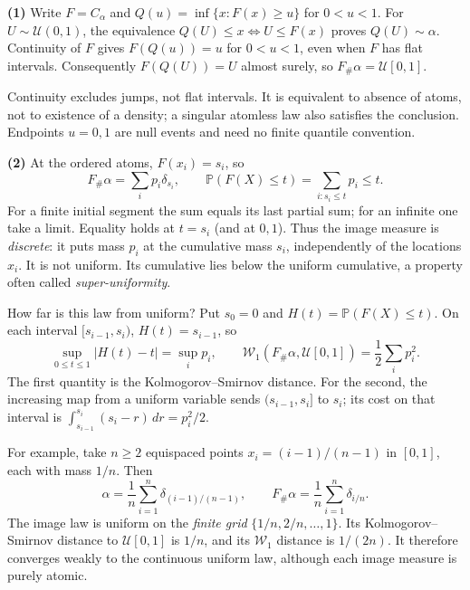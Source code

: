 \documentclass[11pt,a4paper]{article}
\theoremstyle{exostyle}
\newcommand{\push}{\#}
\newcommand{\Wone}{\mathcal{W}_1}
\newcommand{\Unif}{\mathcal U}
\begin{document}
\begin{solution}
\textbf{(1)} Write $F=C_\alpha$ and $Q(u)=\inf\{x:F(x)\ge u\}$ for $0<u<1$. For $U\sim\Unif(0,1)$, the equivalence $Q(U)\le x\iff U\le F(x)$ proves $Q(U)\sim\alpha$. Continuity of $F$ gives $F(Q(u))=u$ for $0<u<1$, even when $F$ has flat intervals. Consequently $F(Q(U))=U$ almost surely, so $F_\#\alpha=\Unif[0,1]$.

Continuity excludes jumps, not flat intervals. It is equivalent to absence of atoms, not to existence of a density; a singular atomless law also satisfies the conclusion. Endpoints $u=0,1$ are null events and need no finite quantile convention.

\textbf{(2)} At the ordered atoms, $F(x_i)=s_i$, so
\[
F_\#\alpha=\sum_i p_i\delta_{s_i},\qquad
\mathbb P(F(X)\le t)=\sum_{i:s_i\le t}p_i\le t.
\]
For a finite initial segment the sum equals its last partial sum; for an infinite one take a limit. Equality holds at $t=s_i$ (and at $0,1$). Thus the image measure is \emph{discrete}: it puts mass $p_i$ at the cumulative mass $s_i$, independently of the locations $x_i$. It is not uniform. Its cumulative lies below the uniform cumulative, a property often called \emph{super-uniformity}.

How far is this law from uniform? Put $s_0=0$ and $H(t)=\mathbb P(F(X)\le t)$. On each interval $[s_{i-1},s_i)$, $H(t)=s_{i-1}$, so
\[
\sup_{0\le t\le1}|H(t)-t|=\sup_i p_i,
\qquad
\Wone(F_{\push}\alpha,\Unif[0,1])=\frac12\sum_i p_i^2.
\]
The first quantity is the Kolmogorov--Smirnov distance. For the second, the increasing map from a uniform variable sends $(s_{i-1},s_i]$ to $s_i$; its cost on that interval is $\int_{s_{i-1}}^{s_i}(s_i-r)\,dr=p_i^2/2$.

For example, take $n\ge2$ equispaced points $x_i=(i-1)/(n-1)$ in $[0,1]$, each with mass $1/n$. Then
\[
\alpha=\frac1n\sum_{i=1}^n\delta_{(i-1)/(n-1)},
\qquad
F_{\push}\alpha=\frac1n\sum_{i=1}^n\delta_{i/n}.
\]
The image law is uniform on the \emph{finite grid} $\{1/n,2/n,\ldots,1\}$. Its Kolmogorov--Smirnov distance to $\Unif[0,1]$ is $1/n$, and its $\Wone$ distance is $1/(2n)$. It therefore converges weakly to the continuous uniform law, although each image measure is purely atomic.
\end{solution}
\end{document}
